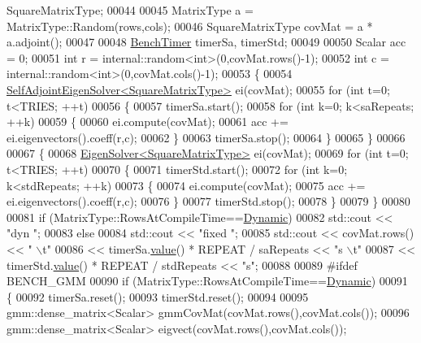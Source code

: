 \begin{DoxyCode}
       SquareMatrixType;
00044 
00045   MatrixType a = MatrixType::Random(rows,cols);
00046   SquareMatrixType covMat =  a * a.adjoint();
00047 
00048   \hyperlink{class_eigen_1_1_bench_timer}{BenchTimer} timerSa, timerStd;
00049 
00050   Scalar acc = 0;
00051   \textcolor{keywordtype}{int} r = internal::random<int>(0,covMat.rows()-1);
00052   \textcolor{keywordtype}{int} c = internal::random<int>(0,covMat.cols()-1);
00053   \{
00054     \hyperlink{group___eigenvalues___module_class_eigen_1_1_self_adjoint_eigen_solver}{SelfAdjointEigenSolver<SquareMatrixType>} ei(covMat);
00055     \textcolor{keywordflow}{for} (\textcolor{keywordtype}{int} t=0; t<TRIES; ++t)
00056     \{
00057       timerSa.start();
00058       \textcolor{keywordflow}{for} (\textcolor{keywordtype}{int} k=0; k<saRepeats; ++k)
00059       \{
00060         ei.compute(covMat);
00061         acc += ei.eigenvectors().coeff(r,c);
00062       \}
00063       timerSa.stop();
00064     \}
00065   \}
00066 
00067   \{
00068     \hyperlink{group___eigenvalues___module_class_eigen_1_1_eigen_solver}{EigenSolver<SquareMatrixType>} ei(covMat);
00069     \textcolor{keywordflow}{for} (\textcolor{keywordtype}{int} t=0; t<TRIES; ++t)
00070     \{
00071       timerStd.start();
00072       \textcolor{keywordflow}{for} (\textcolor{keywordtype}{int} k=0; k<stdRepeats; ++k)
00073       \{
00074         ei.compute(covMat);
00075         acc += ei.eigenvectors().coeff(r,c);
00076       \}
00077       timerStd.stop();
00078     \}
00079   \}
00080 
00081   \textcolor{keywordflow}{if} (MatrixType::RowsAtCompileTime==\hyperlink{namespace_eigen_ad81fa7195215a0ce30017dfac309f0b2}{Dynamic})
00082     std::cout << \textcolor{stringliteral}{"dyn   "};
00083   \textcolor{keywordflow}{else}
00084     std::cout << \textcolor{stringliteral}{"fixed "};
00085   std::cout << covMat.rows() << \textcolor{stringliteral}{" \(\backslash\)t"}
00086             << timerSa.\hyperlink{class_eigen_1_1_bench_timer_a26760f963ed8b64c126159bfea57735e}{value}() * REPEAT / saRepeats << \textcolor{stringliteral}{"s \(\backslash\)t"}
00087             << timerStd.\hyperlink{class_eigen_1_1_bench_timer_a26760f963ed8b64c126159bfea57735e}{value}() * REPEAT / stdRepeats << \textcolor{stringliteral}{"s"};
00088 
00089 \textcolor{preprocessor}{  #ifdef BENCH\_GMM}
00090   \textcolor{keywordflow}{if} (MatrixType::RowsAtCompileTime==\hyperlink{namespace_eigen_ad81fa7195215a0ce30017dfac309f0b2}{Dynamic})
00091   \{
00092     timerSa.reset();
00093     timerStd.reset();
00094 
00095     gmm::dense\_matrix<Scalar> gmmCovMat(covMat.rows(),covMat.cols());
00096     gmm::dense\_matrix<Scalar> eigvect(covMat.rows(),covMat.cols());

\end{DoxyCode}
